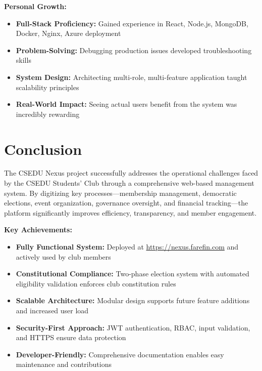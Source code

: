 \documentclass[12pt,a4paper]{article}
\begin{document}
\textbf{Personal Growth:}

\begin{itemize}[noitemsep]
  \item \textbf{Full-Stack Proficiency:} Gained experience in React, Node.js, MongoDB, Docker, Nginx, Azure deployment
  \item \textbf{Problem-Solving:} Debugging production issues developed troubleshooting skills
  \item \textbf{System Design:} Architecting multi-role, multi-feature application taught scalability principles
  \item \textbf{Real-World Impact:} Seeing actual users benefit from the system was incredibly rewarding
\end{itemize}

\section{Conclusion}

The CSEDU Nexus project successfully addresses the operational challenges faced by the CSEDU Students' Club through a comprehensive web-based management system. By digitizing key processes—membership management, democratic elections, event organization, governance oversight, and financial tracking—the platform significantly improves efficiency, transparency, and member engagement.

\textbf{Key Achievements:}

\begin{itemize}[noitemsep]
  \item \textbf{Fully Functional System:} Deployed at \url{https://nexus.farefin.com} and actively used by club members
  \item \textbf{Constitutional Compliance:} Two-phase election system with automated eligibility validation enforces club constitution rules
  \item \textbf{Scalable Architecture:} Modular design supports future feature additions and increased user load
  \item \textbf{Security-First Approach:} JWT authentication, RBAC, input validation, and HTTPS ensure data protection
  \item \textbf{Developer-Friendly:} Comprehensive documentation enables easy maintenance and contributions
\end{itemize}
\end{document}
